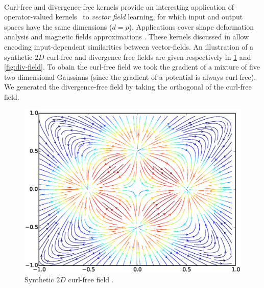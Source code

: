 \paragraph{}
Curl-free and divergence-free kernels provide an interesting application of
operator-valued kernels~\citep{Macedo2008, Baldassare2012, Micheli2013} to
\emph{vector field} learning, for which input and output spaces have the same
dimensions ($d=p$). Applications cover shape deformation
analysis \citep{Micheli2013} and magnetic fields
approximations \citep{Wahlstrom2013}. These kernels discussed in
\citep{Fuselier2006} allow encoding input-dependent similarities between
vector-fields. An illustration of a synthetic $2D$ curl-free and divergence
free fields are given respectively in \cref{fig:curl-field} and
\cref{fig:div-field}. To obain the curl-free field we took the gradient of
a mixture of five two dimensional Gaussians (since the gradient of a potential
is always curl-free). We generated the divergence-free field by taking the
orthogonal of the curl-free field.
\begin{figure}
    \centering
    \includegraphics[trim=1.8cm 1cm 2cm 1cm,width=\textwidth,clip=true]{./gfx/curl_field.eps}
    \caption{Synthetic $2D$ curl-free field \label{fig:curl-field}.}
\end{figure}
